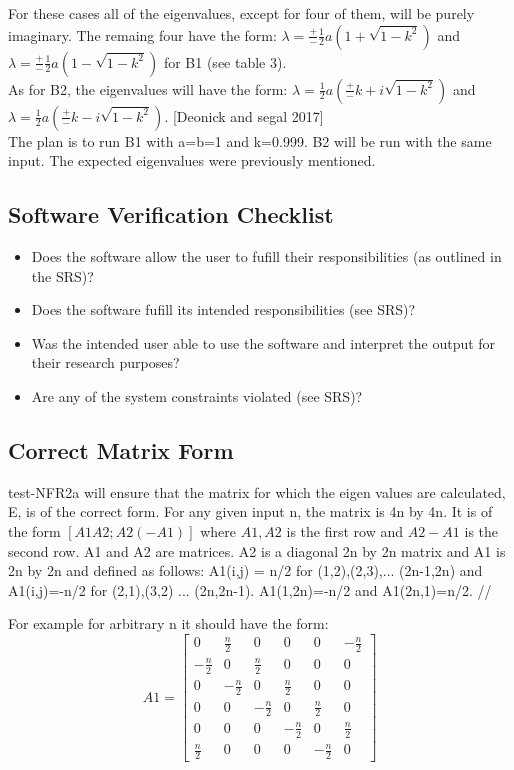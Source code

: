 \documentclass[12pt, titlepage]{article}
\begin{document}
For these cases all of the eigenvalues, except for four of them, will be purely 
imaginary. The remaing four have the form: $\lambda = \frac{+}{-} \frac{1}{2} a 
(1+\sqrt{1-k^{2}})$ and $\lambda = \frac{+}{-} \frac{1}{2} a 
(1-\sqrt{1-k^{2}})$ for B1 (see table 3). \\ 
As for B2, the eigenvalues will have the form:  $\lambda =  \frac{1}{2} a 
(\frac{+}{-}k+ i \sqrt{1-k^{2}})$ and $\lambda = \frac{1}{2} a 
(\frac{+}{-}k - i \sqrt{1-k^{2}})$. [Deonick and segal 2017] \\ 
The plan is to run B1 with a=b=1 and k=0.999. B2 will be run with the same 
input. The expected eigenvalues were previously mentioned. 

\subsection{Software Verification Checklist} 

\begin{itemize}
	\item Does the software allow the user to fufill their responsibilities 
	(as outlined in the SRS)?
	\item Does the software fufill its intended responsibilities (see SRS)?
	\item Was the intended user able to use the software and interpret the 
	output for their research purposes?
	\item Are any of the system constraints violated (see SRS)?
\end{itemize}  

\newpage	
\subsection{Correct Matrix Form} 

test-NFR2a will ensure that the matrix for which the eigen values are 
calculated, E, is of the correct form. For any given input n, the matrix is 4n 
by 4n. It is of the form $ [A1 A2; A2 (-A1)] $ where $ A1, A2$ is the first 
row 
and $A2 -A1$ is the second row. A1 and A2 are matrices. A2 is a diagonal 2n by 
2n matrix and A1 is 2n by 2n and defined as follows: A1(i,j) = n/2 for 
(1,2),(2,3),... (2n-1,2n) and A1(i,j)=-n/2 for (2,1),(3,2) ... (2n,2n-1). 
A1(1,2n)=-n/2 and A1(2n,1)=n/2. // 

For example for arbitrary n it should have the form: 
\[
A1=
\begin{bmatrix}
0 & \frac{n}{2} & 0 & 0 & 0 &-\frac{n}{2}\\
-\frac{n}{2} & 0 & \frac{n}{2} & 0 & 0 &0\\
0 & -\frac{n}{2} & 0 & \frac{n}{2} & 0 &0\\
0 & 0 & -\frac{n}{2} & 0 & \frac{n}{2} &0\\
0 & 0 & 0 & -\frac{n}{2} & 0 &\frac{n}{2} \\ 
\frac{n}{2} & 0 & 0 & 0 & -\frac{n}{2} & 0 
\end{bmatrix}
\] 
\end{document}
